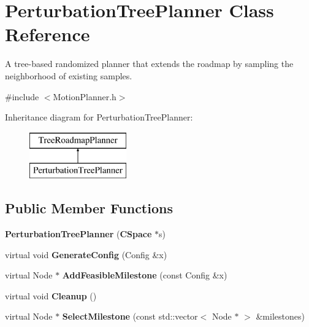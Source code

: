 \section{Perturbation\+Tree\+Planner Class Reference}
\label{classPerturbationTreePlanner}


A tree-\/based randomized planner that extends the roadmap by sampling the neighborhood of existing samples.  




{\ttfamily \#include $<$Motion\+Planner.\+h$>$}

Inheritance diagram for Perturbation\+Tree\+Planner\+:\begin{figure}[H]
\begin{center}
\leavevmode
\includegraphics[height=2.000000cm]{classPerturbationTreePlanner}
\end{center}
\end{figure}
\subsection*{Public Member Functions}
\begin{DoxyCompactItemize}
\item 
{\bfseries Perturbation\+Tree\+Planner} ({\bf C\+Space} $\ast$s)\label{classPerturbationTreePlanner_a099fa6cd4b3ba628254cf6e078d08dc2}

\item 
virtual void {\bfseries Generate\+Config} (Config \&x)\label{classPerturbationTreePlanner_a61284d3fb56cd90321747a2930bf9805}

\item 
virtual Node $\ast$ {\bfseries Add\+Feasible\+Milestone} (const Config \&x)\label{classPerturbationTreePlanner_adf7f83d9404e5558d479c80cf5270d63}

\item 
virtual void {\bfseries Cleanup} ()\label{classPerturbationTreePlanner_a0d39b8652c4a87cd8a6d93956f292378}

\item 
virtual Node $\ast$ {\bfseries Select\+Milestone} (const std\+::vector$<$ Node $\ast$ $>$ \&milestones)\label{classPerturbationTreePlanner_aaede55096272a619a11a0de1e175e496}

\end{DoxyCompactItemize}
